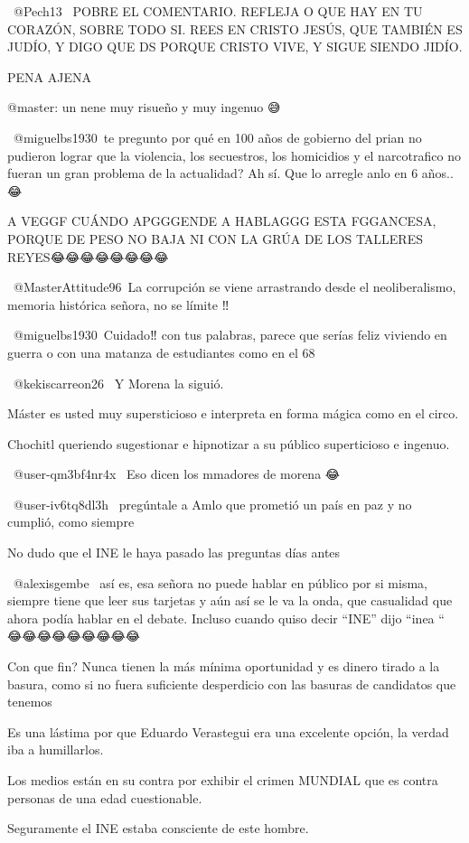 ​ @Pech13 
POBRE EL COMENTARIO.
REFLEJA O QUE HAY EN TU CORAZÓN, SOBRE TODO SI. REES EN CRISTO JESÚS, QUE TAMBIÉN ES JUDÍO, Y DIGO QUE DS PORQUE CRISTO VIVE, Y SIGUE SIENDO JIDÍO.


PENA AJENA

@master: un nene muy risueño  y muy ingenuo 😅

​ @miguelbs1930 te pregunto por qué en 100 años de gobierno del prian no pudieron lograr que la violencia, los secuestros, los homicidios y el narcotrafico no fueran  un gran problema de la actualidad? Ah sí. Que lo arregle anlo en 6 años.. 😂

A VEGGF CUÁNDO APGGGENDE A HABLAGGG ESTA FGGANCESA, PORQUE DE PESO NO BAJA NI CON LA GRÚA DE LOS TALLERES REYES😂😂😂😂😂😂😂😂

​ @MasterAttitude96 La corrupción se viene arrastrando desde el neoliberalismo, memoria histórica señora, no se límite ‼️

​ @miguelbs1930 Cuidado‼️ con tus palabras, parece que serías feliz viviendo en guerra o con una matanza de estudiantes como en el 68

 @kekiscarreon26  Y Morena la siguió.

Máster es usted muy supersticioso e interpreta en forma mágica como en el circo.

Chochitl  queriendo sugestionar e hipnotizar a su público superticioso e ingenuo.

 @user-qm3bf4nr4x  Eso dicen los mmadores de morena 😂

 @user-iv6tq8dl3h   pregúntale a Amlo que prometió un país en paz y no cumplió, como siempre

No dudo que el INE  le haya pasado las preguntas días antes

 @alexisgembe  así es, esa señora no puede hablar en público por si misma, siempre tiene que leer sus tarjetas y aún así se le va la onda, que casualidad que ahora podía hablar en el debate. Incluso cuando quiso decir “INE” dijo “inea “ 😂😂😂😂😂😂😂😂😂

Con que fin? Nunca tienen la más mínima oportunidad y es dinero tirado a la basura, como si no fuera suficiente desperdicio con las basuras de candidatos que tenemos

Es una lástima por que Eduardo Verastegui era una excelente opción, la verdad iba a humillarlos.


Los medios están en su contra por exhibir el crimen MUNDIAL que es contra personas de una edad cuestionable. 

Seguramente el INE estaba consciente de este hombre.

